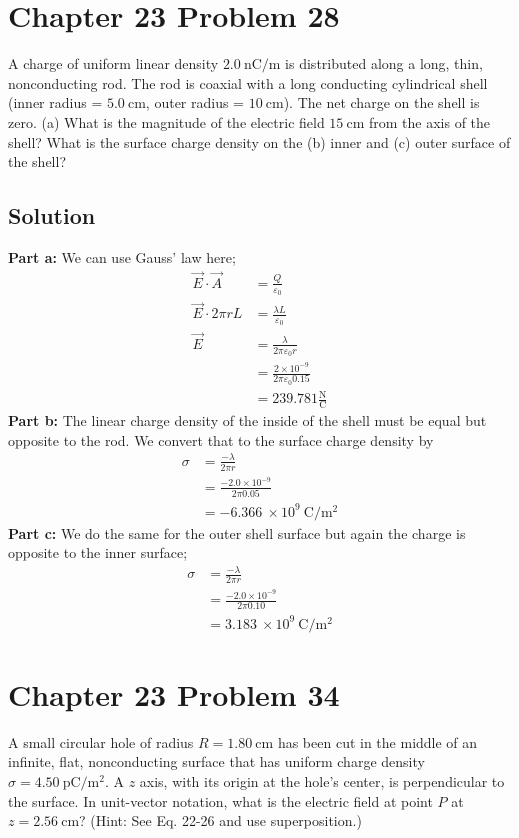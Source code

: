\documentclass{article}
\newcommand{\m}{\text{m}}
\newcommand{\centi}{\text{c}}
\newcommand{\N}{\text{N}}
\newcommand{\C}{\text{C}}
\begin{document}
\section*{Chapter 23 Problem 28}
A charge of uniform linear density $2.0\ \text{n}\C/\m$ is distributed along a long, thin, nonconducting rod. The rod is coaxial with a long conducting cylindrical shell (inner radius = $5.0\ \centi \m$, outer radius = $10\ \centi \m$). The net charge on the shell is zero. (a) What is the magnitude of the electric field $15\ \centi \m$ from the axis of the shell? What is the surface charge density on the (b) inner and (c) outer surface of the shell?

\subsection*{Solution}
\textbf{Part a:} We can use Gauss' law here;
\begin{align*}
    \vec{E} \cdot \vec{A} &= \frac{Q}{\varepsilon_0} \\
    \vec{E} \cdot 2\pi r L &= \frac{\lambda L}{\varepsilon_0} \\
    \vec{E} &= \frac{\lambda}{2\pi \varepsilon_0 r} \\
    &= \frac{2 \times 10^{-9}}{2\pi \varepsilon_0 0.15} \\
    &= \boxed{239.781 \frac{\N}{\C}}
\end{align*}
\textbf{Part b:} The linear charge density of the inside of the shell must be equal but opposite to the rod. We convert that to the surface charge density by
\begin{align*}
	\sigma &= \frac{-\lambda}{2\pi r} \\
		   &= \frac{-2.0 \times 10^{-9}}{2\pi 0.05} \\
		   &= \boxed{-6.366\ \times 10^9\ \C/\m^2}
\end{align*}
\textbf{Part c:} We do the same for the outer shell surface but again the charge is opposite to the inner surface;
\begin{align*}
	\sigma &= \frac{-\lambda}{2\pi r} \\
		   &= \frac{-2.0 \times 10^{-9}}{2\pi 0.10} \\
		   &= \boxed{3.183\ \times 10^9\ \C/\m^2}
\end{align*}

\section*{Chapter 23 Problem 34}
A small circular hole of radius $R = 1.80\ \centi \m$ has been cut in the middle of an infinite, flat, nonconducting surface that has uniform charge density $\sigma = 4.50\ \text{p}\C/\m^2$. A $z$ axis, with its origin at the hole's center, is perpendicular to the surface. In unit-vector notation, what is the electric field at point $P$ at $z = 2.56\ \centi \m$?
(Hint: See Eq. 22-26 and use superposition.)
\end{document}
